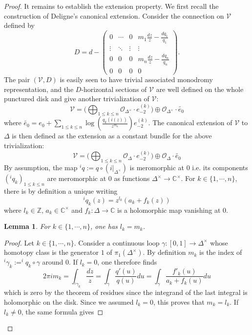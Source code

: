 \documentclass[10pt]{article}
\numberwithin{equation}{subsection}
\theoremstyle{plain}
\newtheorem{lemma}[theorem]{Lemma}
\theoremstyle{definition}
\theoremstyle{remark}
\newcommand{\Z}{\mathbb Z}
\newcommand{\C}{\mathbb C}
\begin{document}
\begin{proof}
It remains to establish the extension property. We first recall the construction of Deligne's canonical extension. Consider the connection on $\mathcal{V}$ defined by
\[
D = d - \left(\begin{array}{cccc}0  &  \cdots & 0 & m_1\frac{dz}{z} - \frac{d q_1}{q_1}  \\ \vdots & \ddots & \vdots & \vdots \\0 & 0 & 0 & m_n\frac{dz}{z} - \frac{d q_n}{q_n}  \\0 & 0 & 0 & 0\end{array}\right).
\]
The pair $(\mathcal{V}, D)$ is easily seen to have trivial associated monodromy representation, and the $D$-horizontal sections of $\mathcal{V}$ are well defined on the whole punctured disk and give another trivialization of $\mathcal{V}$:
\[
\mathcal{V} = \Big(\bigoplus_{1 \leqslant k \leqslant n} \mathcal{O}_{\Delta^\times} \cdot e_{-2}^{(k)} \Big) \oplus \mathcal{O}_{\Delta^\times} \cdot \tilde{e_0}
\]
where $\tilde{e_0} = e_0 + \sum_{1 \leqslant k \leqslant n} \log(\frac{q_k(i(z))}{z^{m_k}})e_{-2}^{(k)}$.
The canonical extension of $\mathcal{V}$ to $\Delta$ is then defined as the extension as a constant bundle for the above trivialization:
\[
\mathcal{V} = \Big(\bigoplus_{1 \leqslant k \leqslant n} \mathcal{O}_{\Delta} \cdot e_{-2}^{(k)} \Big) \oplus \mathcal{O}_{\Delta} \cdot \tilde{e_0}
\]
By assumption, the map $^iq := q \circ (i \vert_{\Delta^\times})$ is meromorphic at $0$ i.e. its components $(^iq_k)_{1 \leqslant k \leqslant n}$ are meromorphic at $0$ as functions $\Delta^\times \rightarrow \C^\times$. For $k \in \{1,\cdots, n\}$, there is by definition a unique writing
\[
^iq_k(z) = z^{l_k} (a_k + f_k(z))
\]
where $l_k \in \Z$, $a_k \in \C^\times$ and $f_k : \Delta \rightarrow \C$ is a holomorphic map vanishing at $0$.
\begin{lemma}\label{egal}
For $k \in \{1,\cdots, n\}$, one has $l_k = m_k$.
\end{lemma}
\begin{proof}
Let $k \in \{1,\cdots, n\}$. Consider a continuous loop $\gamma : [0,1] \rightarrow \Delta^\times$ whose homotopy class is the generator $1$ of $\pi_1(\Delta^\times)$. By definition $m_k$ is the index of $^i\gamma_k := ^iq_k \circ \gamma$ around $0$. If $l_k = 0$, one therefore finds
\[
2 \pi i m_k = \int_{^i\gamma_k} \frac{dz}{z} = \int_\gamma \frac{q'(u)}{q(u)}du = \int_\gamma \frac{f'_k(u)}{a_k + f_k(u)}du
\]
which is zero by the theorem of residues since the integrand of the last integral is holomorphic on the disk. Since we assumed $l_k = 0$, this proves that $m_k = l_k$. If $l_k \neq 0$, the same formula gives

\end{proof}
\end{proof}
\end{document}
